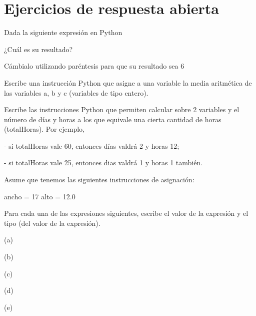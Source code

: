 \hypertarget{ejercicios}{%
\section*{Ejercicios de respuesta abierta}\label{ejercicios}}



\begin{ejercicio}Dada la siguiente expresión en Python 


¿Cuál es su resultado?

Cámbialo utilizando paréntesis para que su resultado sea 6
\end{ejercicio}




\begin{ejercicio}Escribe una instrucción Python que asigne a una variable la media aritmética de las variables a, b y c (variables de tipo entero). 
\end{ejercicio}

\begin{ejercicio}Escribe las instrucciones Python que permiten calcular sobre 2 variables  y  el número de días y horas a los que equivale una cierta cantidad de horas (totalHoras). Por ejemplo, 

- si totalHoras vale 60, entonces días valdrá 2 y horas 12; 

- si totalHoras vale 25, entonces dias valdrá 1 y horas 1 también.
\end{ejercicio}


\begin{ejercicio}Asume que tenemos las siguientes instrucciones de asignación:
\begin{python}
    ancho = 17
    alto = 12.0
\end{python}

Para cada una de las expresiones siguientes, escribe el valor de la
expresión y el tipo (del valor de la expresión).

(a)  

(b)   

(c)   

(d)   

(e)   
\end{ejercicio}


